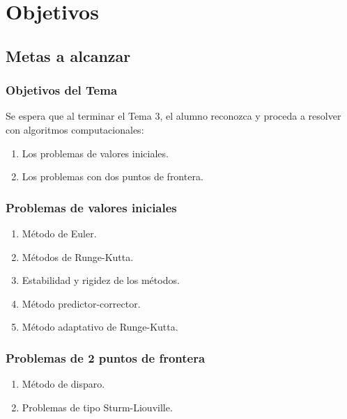 \documentclass[12pt]{beamer}
\begin{document}
\section{Objetivos}
\subsection{Metas a alcanzar}

\begin{frame}
\frametitle{Objetivos del Tema}
Se espera que al terminar el Tema 3, el alumno reconozca y proceda a resolver con algoritmos computacionales:
\begin{enumerate}[<+->]
\item Los problemas de valores iniciales.
\item Los problemas con dos puntos de frontera.
\end{enumerate}
\end{frame}
\begin{frame}
\frametitle{Problemas de valores iniciales}
\begin{enumerate}[<+->]
\item Método de Euler.
\item Métodos de Runge-Kutta.
\item Estabilidad y rigidez de los métodos.
\item Método predictor-corrector.
\item Método adaptativo de Runge-Kutta.
\end{enumerate}
\end{frame}
\begin{frame}
\frametitle{Problemas de 2 puntos de frontera}
\begin{enumerate}[<+->]
\item Método de disparo.
\item Problemas de tipo Sturm-Liouville.
\end{enumerate}
\end{frame}
\end{document}
